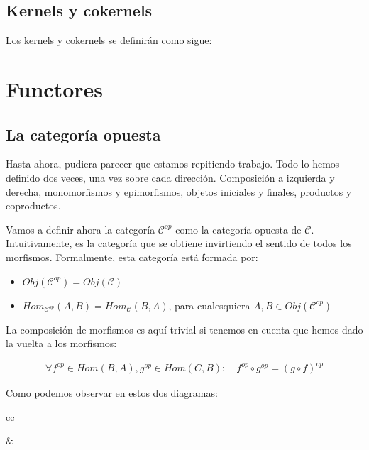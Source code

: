 \documentclass[11pt, fleqn, spanish]{book}
\newcommand{\C}{\mathcal{C}}
\begin{document}
\section{Kernels y cokernels}
Los kernels y cokernels se definirán como sigue:
\begin{center}
\end{center}
\begin{center}
\end{center}

    
\chapter {Functores}
\section{La categoría opuesta}
Hasta ahora, pudiera parecer que estamos repitiendo trabajo. Todo lo
hemos definido dos veces, una vez sobre cada dirección. Composición
a izquierda y derecha, monomorfismos y epimorfismos, objetos
iniciales y finales, productos y coproductos.

Vamos a definir ahora la categoría $\C^{op}$ como la categoría
opuesta de $\C$. Intuitivamente, es la categoría que se obtiene
invirtiendo el sentido de todos los morfismos. Formalmente, esta
categoría está formada por:

\begin{itemize}
\item $Obj(\C^{op}) = Obj(\C)$
\item $Hom_{\C^{op}}(A,B) = Hom_{\C}(B,A)$, para cualesquiera
  $A,B \in Obj(\C^{op})$
\end{itemize}

La composición de morfismos es aquí trivial si tenemos en cuenta
que hemos dado la vuelta a los morfismos:

\begin{gather*}
  \forall f^{op} \in Hom(B,A), g^{op} \in Hom(C,B):\quad f^{op} \circ g^{op} = (g \circ f)^{op}
\end{gather*}

Como podemos observar en estos dos diagramas:

\begin{center}
  \begin{tabular}{cc}
    &
  \end{tabular}
\end{center}
\end{document}
